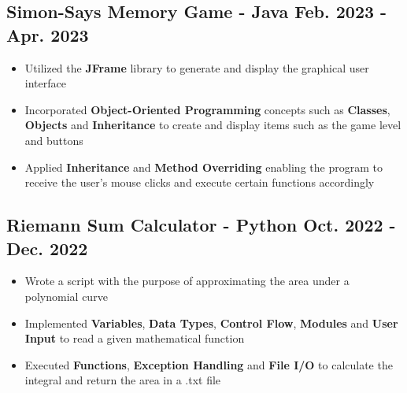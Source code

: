 \documentclass[10pt]{article}
\newcommand{\rightindent}[1]{\hfill{\textmd{#1}}}
\begin{document}
\subsection{Simon-Says Memory Game \textmd{- Java} \rightindent{Feb. 2023 - Apr. 2023}}
\begin{itemize} 
    \item Utilized the \textbf{JFrame} library to generate and display the graphical user interface
    \item Incorporated \textbf{Object-Oriented Programming} concepts such as \textbf{Classes}, \textbf{Objects} and \textbf{Inheritance} to create and display items such as the game level and buttons
    \item Applied \textbf{Inheritance} and \textbf{Method Overriding} enabling the program to receive the user’s mouse clicks and execute certain functions accordingly
\end{itemize}
\subsection{Riemann Sum Calculator \textmd{- Python} \rightindent{Oct. 2022 - Dec. 2022}}
\begin{itemize} 
    \item Wrote a script with the purpose of approximating the area under a polynomial curve
    \item Implemented \textbf{Variables}, \textbf{Data Types}, \textbf{Control Flow}, \textbf{Modules} and \textbf{User Input} to read a given mathematical function
    \item Executed \textbf{Functions}, \textbf{Exception Handling} and \textbf{File I/O} to calculate the integral and return the area in a .txt file
\end{itemize}
\end{document}
